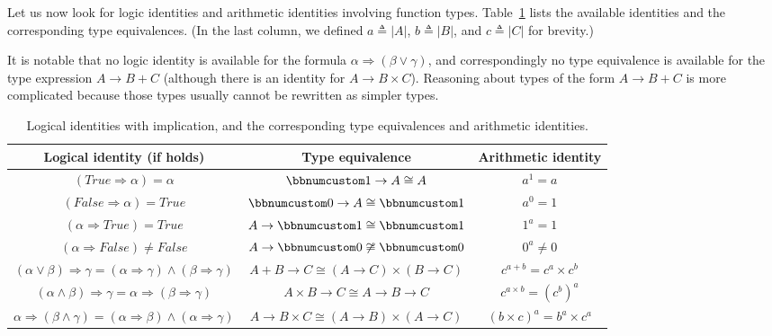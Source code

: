 Let us now look for logic identities and arithmetic identities involving
function types. Table~\ref{tab:Logical-identities-with-function-types}
lists the available identities and the corresponding type equivalences.
(In the last column, we defined $a\triangleq\left|A\right|$, $b\triangleq\left|B\right|$,
and $c\triangleq\left|C\right|$ for brevity.) 

It is notable that no logic identity is available for the formula
$\alpha\Rightarrow\left(\beta\vee\gamma\right)$, and correspondingly
no type equivalence is available for the type expression $A\rightarrow B+C$
(although there is an identity for $A\rightarrow B\times C$). Reasoning
about types of the form $A\rightarrow B+C$ is more complicated because
those types usually cannot be rewritten as simpler types.

\begin{table}
\begin{centering}
\begin{tabular}{|c|c|c|}
\hline 
\textbf{\footnotesize{}Logical identity (if holds)} & \textbf{\footnotesize{}Type equivalence} & \textbf{\footnotesize{}Arithmetic identity}\tabularnewline
\hline 
\hline 
{\footnotesize{}$\left(True\Rightarrow\alpha\right)=\alpha$} & {\footnotesize{}$\bbnum 1\rightarrow A\cong A$} & {\footnotesize{}$a^{1}=a$}\tabularnewline
\hline 
{\footnotesize{}$\left(False\Rightarrow\alpha\right)=True$} & {\footnotesize{}$\bbnum 0\rightarrow A\cong\bbnum 1$} & {\footnotesize{}$a^{0}=1$}\tabularnewline
\hline 
{\footnotesize{}$\left(\alpha\Rightarrow True\right)=True$} & {\footnotesize{}$A\rightarrow\bbnum 1\cong\bbnum 1$} & {\footnotesize{}$1^{a}=1$}\tabularnewline
\hline 
{\footnotesize{}$\left(\alpha\Rightarrow False\right)\neq False$} & {\footnotesize{}$A\rightarrow\bbnum 0\not\cong\bbnum 0$} & {\footnotesize{}$0^{a}\neq0$}\tabularnewline
\hline 
{\footnotesize{}$\left(\alpha\vee\beta\right)\Rightarrow\gamma=\left(\alpha\Rightarrow\gamma\right)\wedge\left(\beta\Rightarrow\gamma\right)$} & {\footnotesize{}$A+B\rightarrow C\cong\left(A\rightarrow C\right)\times\left(B\rightarrow C\right)$} & {\footnotesize{}$c^{a+b}=c^{a}\times c^{b}$}\tabularnewline
\hline 
{\footnotesize{}$(\alpha\wedge\beta)\Rightarrow\gamma=\alpha\Rightarrow\left(\beta\Rightarrow\gamma\right)$} & {\footnotesize{}$A\times B\rightarrow C\cong A\rightarrow B\rightarrow C$} & {\footnotesize{}$c^{a\times b}=(c^{b})^{a}$}\tabularnewline
\hline 
{\footnotesize{}$\alpha\Rightarrow\left(\beta\wedge\gamma\right)=\left(\alpha\Rightarrow\beta\right)\wedge\left(\alpha\Rightarrow\gamma\right)$} & {\footnotesize{}$A\rightarrow B\times C\cong\left(A\rightarrow B\right)\times\left(A\rightarrow C\right)$} & {\footnotesize{}$\left(b\times c\right)^{a}=b^{a}\times c^{a}$}\tabularnewline
\hline 
\end{tabular}
\par\end{centering}
\caption{Logical identities with implication, and the corresponding type equivalences
and arithmetic identities.\label{tab:Logical-identities-with-function-types}}
\end{table}


